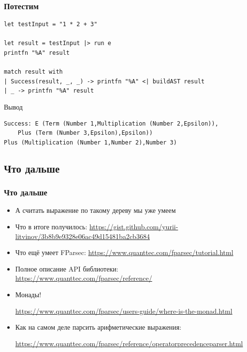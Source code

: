\documentclass{../../slides-style}
\begin{document}
    \begin{frame}[fragile]
        \frametitle{Потестим}
        \begin{verbatim}
let testInput = "1 * 2 + 3"

let result = testInput |> run e
printfn "%A" result

match result with
| Success(result, _, _) -> printfn "%A" <| buildAST result
| _ -> printfn "%A" result
        \end{verbatim}

        \begin{exampleblock}{Вывод}
            \begin{verbatim}
Success: E (Term (Number 1,Multiplication (Number 2,Epsilon)),
    Plus (Term (Number 3,Epsilon),Epsilon))
Plus (Multiplication (Number 1,Number 2),Number 3)
            \end{verbatim}
        \end{exampleblock}
    \end{frame}

    \subsection{Что дальше}

    \begin{frame}
        \frametitle{Что дальше}
        \begin{small}
            \begin{itemize}
                \item А считать выражение по такому дереву мы уже умеем
                \item Что в итоге получилось: \url{https://gist.github.com/yurii-litvinov/3b8b9e9328e06ac49d15481ba2cb3684}
                \item Что ещё умеет FParsec: \url{https://www.quanttec.com/fparsec/tutorial.html}
                \item Полное описание API библиотеки: \url{https://www.quanttec.com/fparsec/reference/}
                \item Монады! 
                
                \url{https://www.quanttec.com/fparsec/users-guide/where-is-the-monad.html}
                \item Как на самом деле парсить арифметические выражения: 
                
                \url{https://www.quanttec.com/fparsec/reference/operatorprecedenceparser.html}
            \end{itemize}
        \end{small}
    \end{frame}
\end{document}
